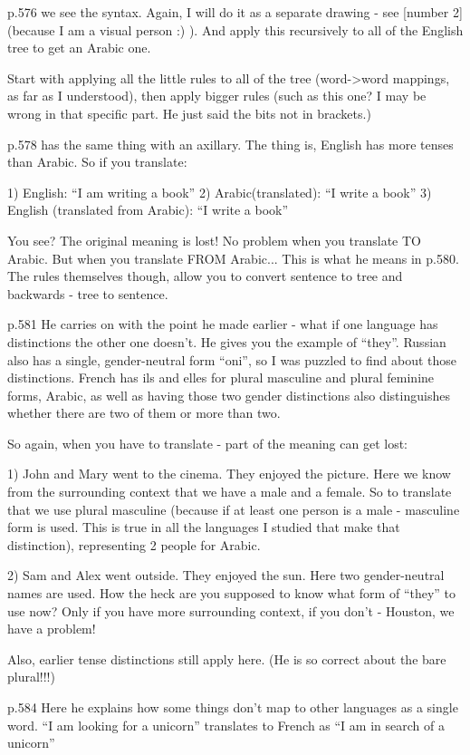 p.576 we see the syntax. Again, I will do it as a separate drawing - see [number
2] (because I am a visual person :) ). And apply this recursively to all of the
English tree to get an Arabic one.

Start with applying all the little rules to all of the tree (word->word
mappings, as far as I understood), then apply bigger rules (such as this one? I
may be wrong in that specific part. He just said the bits not in brackets.)

p.578 has the same thing with an axillary. The thing is, English has more tenses
than Arabic. So if you translate:

1) English: ``I am writing a book''
2) Arabic(translated): ``I write a book''
3) English (translated from Arabic): ``I write a book''

You see? The original meaning is lost! No problem when you translate TO Arabic.
But when you translate FROM Arabic... This is what he means in  p.580. The rules
themselves though, allow you to convert sentence to tree and backwards - tree to
sentence.

p.581 He carries on with the point he made earlier - what if one language has
distinctions the other one doesn't. He gives you the example of ``they''.
Russian also has a single, gender-neutral form ``oni'', so I was puzzled to find
about those distinctions. French has ils and elles for plural masculine and
plural feminine forms, Arabic, as well as having those two gender distinctions
also distinguishes whether there are two of them or more than two.

So again, when you have to translate - part of the meaning can get lost:

1) John and Mary went to the cinema. They enjoyed the picture. Here we know from
the surrounding context that we have a male and a female. So to translate that
we use plural masculine (because if at least one person is a male - masculine
form is used. This is true in all the languages I studied that make that
distinction), representing 2 people for Arabic.

2) Sam and Alex went outside. They enjoyed the sun. Here two gender-neutral
names are used. How the heck are you supposed to know what form of ``they'' to
use now? Only if you have more surrounding context, if you don't - Houston, we
have a problem!

Also, earlier tense distinctions still apply here.
(He is so correct about the bare plural!!!)

p.584 Here he explains how some things don't map to other languages as a single
word. ``I am looking for a unicorn'' translates to French as ``I am in search of
a unicorn''

